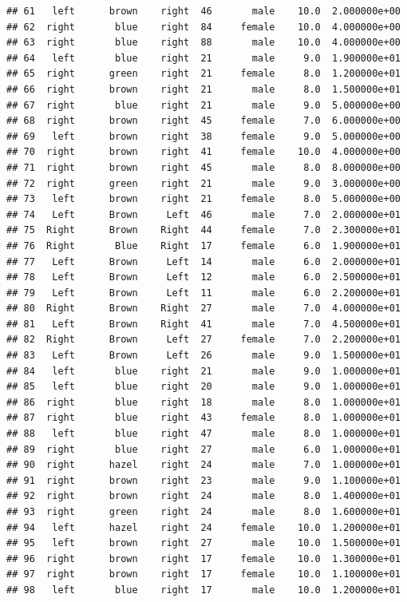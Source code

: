 \documentclass[]{article}
\begin{document}
\begin{verbatim}
## 61   left      brown    right  46       male    10.0  2.000000e+00
## 62  right       blue    right  84     female    10.0  4.000000e+00
## 63  right       blue    right  88       male    10.0  4.000000e+00
## 64   left       blue    right  21       male     9.0  1.900000e+01
## 65  right      green    right  21     female     8.0  1.200000e+01
## 66  right      brown    right  21       male     8.0  1.500000e+01
## 67  right       blue    right  21       male     9.0  5.000000e+00
## 68  right      brown    right  45     female     7.0  6.000000e+00
## 69   left      brown    right  38     female     9.0  5.000000e+00
## 70  right      brown    right  41     female    10.0  4.000000e+00
## 71  right      brown    right  45       male     8.0  8.000000e+00
## 72  right      green    right  21       male     9.0  3.000000e+00
## 73   left      brown    right  21     female     8.0  5.000000e+00
## 74   Left      Brown     Left  46       male     7.0  2.000000e+01
## 75  Right      Brown    Right  44     female     7.0  2.300000e+01
## 76  Right       Blue    Right  17     female     6.0  1.900000e+01
## 77   Left      Brown     Left  14       male     6.0  2.000000e+01
## 78   Left      Brown     Left  12       male     6.0  2.500000e+01
## 79   Left      Brown     Left  11       male     6.0  2.200000e+01
## 80  Right      Brown    Right  27       male     7.0  4.000000e+01
## 81   Left      Brown    Right  41       male     7.0  4.500000e+01
## 82  Right      Brown     Left  27     female     7.0  2.200000e+01
## 83   Left      Brown     Left  26       male     9.0  1.500000e+01
## 84   left       blue    right  21       male     9.0  1.000000e+01
## 85   left       blue    right  20       male     9.0  1.000000e+01
## 86  right       blue    right  18       male     8.0  1.000000e+01
## 87  right       blue    right  43     female     8.0  1.000000e+01
## 88   left       blue    right  47       male     8.0  1.000000e+01
## 89  right       blue    right  27       male     6.0  1.000000e+01
## 90  right      hazel    right  24       male     7.0  1.000000e+01
## 91  right      brown    right  23       male     9.0  1.100000e+01
## 92  right      brown    right  24       male     8.0  1.400000e+01
## 93  right      green    right  24       male     8.0  1.600000e+01
## 94   left      hazel    right  24     female    10.0  1.200000e+01
## 95   left      brown    right  27       male    10.0  1.500000e+01
## 96  right      brown    right  17     female    10.0  1.300000e+01
## 97  right      brown    right  17     female    10.0  1.100000e+01
## 98   left       blue    right  17       male    10.0  1.200000e+01

\end{verbatim}
\end{document}
